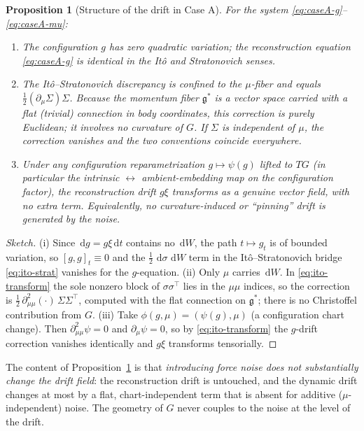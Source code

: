 \documentclass[11pt]{article}
\theoremstyle{plain}
\newtheorem{proposition}{Proposition}
\theoremstyle{definition}
\newcommand{\gstar}{\mathfrak{g}^{*}}
\newcommand{\cd}{\,\mathrm{d}}          %
\newcommand{\dW}{\,\mathrm{d}W}
\newcommand{\dt}{\,\mathrm{d}t}
\newcommand{\half}{\tfrac{1}{2}}
\begin{document}
\begin{proposition}[Structure of the drift in Case A]
\label{prop:caseA}
For the system \eqref{eq:caseA-g}--\eqref{eq:caseA-mu}:
\begin{enumerate}[label=(\roman*),leftmargin=2.2em]
  \item The configuration $g$ has zero quadratic variation; the reconstruction
  equation \eqref{eq:caseA-g} is identical in the It\^o and Stratonovich senses.
  \item The It\^o--Stratonovich discrepancy is confined to the $\mu$-fiber and
  equals $\half(\partial_\mu\Sigma)\Sigma$. Because the momentum fiber $\gstar$
  is a vector space carried with a flat (trivial) connection in body coordinates,
  this correction is purely Euclidean; it involves \emph{no} curvature of $G$. If
  $\Sigma$ is independent of $\mu$, the correction vanishes and the two
  conventions coincide everywhere.
  \item Under any configuration reparametrization $g\mapsto\psi(g)$ lifted to
  $TG$ (in particular the intrinsic $\leftrightarrow$ ambient-embedding map on
  the configuration factor), the reconstruction drift $g\xi$ transforms as a
  genuine vector field, with no extra term. Equivalently, no curvature-induced
  or ``pinning'' drift is generated by the noise.
\end{enumerate}
\end{proposition}

\begin{proof}[Sketch]
(i) Since $\cd g=g\xi\dt$ contains no $\dW$, the path $t\mapsto g_t$ is of bounded
variation, so $[g,g]_t\equiv 0$ and the $\half\,\cd\sigma\,\dW$ term in the
It\^o--Stratonovich bridge \eqref{eq:ito-strat} vanishes for the $g$-equation.
(ii) Only $\mu$ carries $\dW$. In \eqref{eq:ito-transform} the sole nonzero block
of $\sigma\sigma^\top$ lies in the $\mu\mu$ indices, so the correction is
$\half\,\partial^2_{\mu\mu}(\cdot)\,\Sigma\Sigma^\top$, computed with the flat
connection on $\gstar$; there is no Christoffel contribution from $G$. (iii) Take
$\phi(g,\mu)=(\psi(g),\mu)$ (a configuration chart change). Then
$\partial^2_{\mu\mu}\psi=0$ and $\partial_\mu\psi=0$, so by
\eqref{eq:ito-transform} the $g$-drift correction vanishes identically and $g\xi$
transforms tensorially.
\end{proof}

The content of Proposition~\ref{prop:caseA} is that \emph{introducing force noise
does not substantially change the drift field}: the reconstruction drift is
untouched, and the dynamic drift changes at most by a flat, chart-independent
term that is absent for additive ($\mu$-independent) noise. The geometry of $G$
never couples to the noise at the level of the drift.
\end{document}
